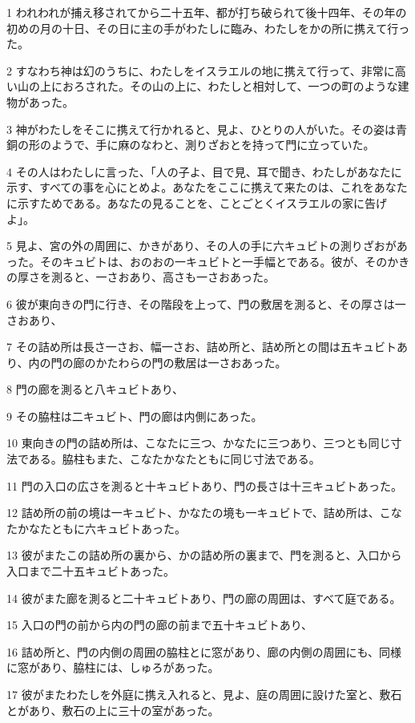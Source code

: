 \par 1 われわれが捕え移されてから二十五年、都が打ち破られて後十四年、その年の初めの月の十日、その日に主の手がわたしに臨み、わたしをかの所に携えて行った。
\par 2 すなわち神は幻のうちに、わたしをイスラエルの地に携えて行って、非常に高い山の上におろされた。その山の上に、わたしと相対して、一つの町のような建物があった。
\par 3 神がわたしをそこに携えて行かれると、見よ、ひとりの人がいた。その姿は青銅の形のようで、手に麻のなわと、測りざおとを持って門に立っていた。
\par 4 その人はわたしに言った、「人の子よ、目で見、耳で聞き、わたしがあなたに示す、すべての事を心にとめよ。あなたをここに携えて来たのは、これをあなたに示すためである。あなたの見ることを、ことごとくイスラエルの家に告げよ」。
\par 5 見よ、宮の外の周囲に、かきがあり、その人の手に六キュビトの測りざおがあった。そのキュビトは、おのおの一キュビトと一手幅とである。彼が、そのかきの厚さを測ると、一さおあり、高さも一さおあった。
\par 6 彼が東向きの門に行き、その階段を上って、門の敷居を測ると、その厚さは一さおあり、
\par 7 その詰め所は長さ一さお、幅一さお、詰め所と、詰め所との間は五キュビトあり、内の門の廊のかたわらの門の敷居は一さおあった。
\par 8 門の廊を測ると八キュビトあり、
\par 9 その脇柱は二キュビト、門の廊は内側にあった。
\par 10 東向きの門の詰め所は、こなたに三つ、かなたに三つあり、三つとも同じ寸法である。脇柱もまた、こなたかなたともに同じ寸法である。
\par 11 門の入口の広さを測ると十キュビトあり、門の長さは十三キュビトあった。
\par 12 詰め所の前の境は一キュビト、かなたの境も一キュビトで、詰め所は、こなたかなたともに六キュビトあった。
\par 13 彼がまたこの詰め所の裏から、かの詰め所の裏まで、門を測ると、入口から入口まで二十五キュビトあった。
\par 14 彼がまた廊を測ると二十キュビトあり、門の廊の周囲は、すべて庭である。
\par 15 入口の門の前から内の門の廊の前まで五十キュビトあり、
\par 16 詰め所と、門の内側の周囲の脇柱とに窓があり、廊の内側の周囲にも、同様に窓があり、脇柱には、しゅろがあった。
\par 17 彼がまたわたしを外庭に携え入れると、見よ、庭の周囲に設けた室と、敷石とがあり、敷石の上に三十の室があった。
